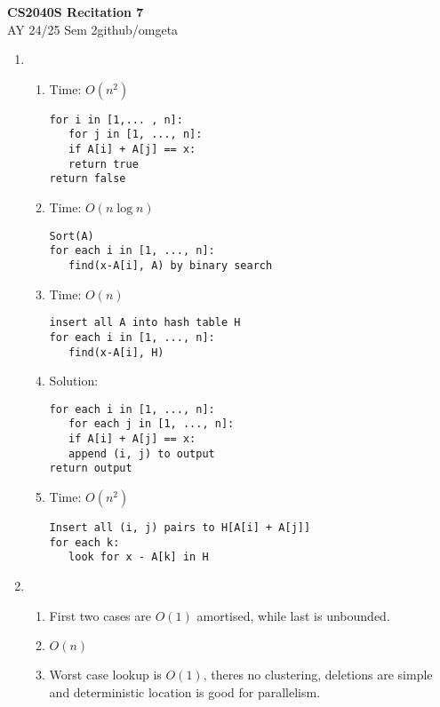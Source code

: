 \documentclass[12pt, a4paper]{article}
\newcommand{\mytitle}{CS2040S Recitation 7}
\newcommand{\myauthor}{github/omgeta}
\newcommand{\mydate}{AY 24/25 Sem 2}
\begin{document}
\raggedright
\footnotesize
\begin{center}
{\normalsize{\textbf{\mytitle}}} \\
{\footnotesize{\mydate\hspace{2pt}\textemdash\hspace{2pt}\myauthor}}
\end{center}
\begin{enumerate}[Q\arabic*.]
  \item 
    \begin{enumerate}[(\alph*.)]
      \item Time: $O(n^2)$
        \begin{lstlisting}
for i in [1,... , n]:
   for j in [1, ..., n]:
   if A[i] + A[j] == x:
   return true
return false
        \end{lstlisting}

      \item Time: $O(n\log n)$ 
        \begin{lstlisting}
Sort(A)
for each i in [1, ..., n]:
   find(x-A[i], A) by binary search
        \end{lstlisting}

      \item Time: $O(n)$
        \begin{lstlisting}
insert all A into hash table H
for each i in [1, ..., n]:
   find(x-A[i], H)
        \end{lstlisting}

      \item Solution:
        \begin{lstlisting}
for each i in [1, ..., n]:
   for each j in [1, ..., n]:
   if A[i] + A[j] == x:
   append (i, j) to output
return output
        \end{lstlisting}

      \item Time: $O(n^2)$
        \begin{lstlisting}
Insert all (i, j) pairs to H[A[i] + A[j]]
for each k:
   look for x - A[k] in H
        \end{lstlisting}
    \end{enumerate}

  \item 
    \begin{enumerate}[(\alph*.)]
      \item First two cases are $O(1)$ amortised, while last is unbounded.

      \item $O(n)$

      \item Worst case lookup is $O(1)$, theres no clustering, deletions are simple and deterministic location is good for parallelism.
    \end{enumerate}
\end{enumerate}
\end{document}
